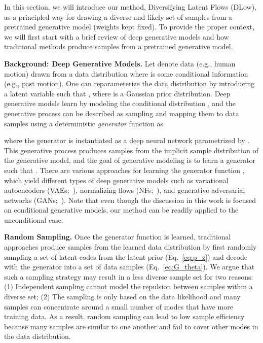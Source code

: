 \documentclass[runningheads]{llncs}
\begin{document}
	In this section, we will introduce our method, Diversifying Latent Flows (DLow), as a principled way for drawing a diverse and likely set of samples from a pretrained generative model (weights kept fixed). To provide the proper context, we will first start with a brief review of deep generative models and how traditional methods produce samples from a pretrained generative model.
	
	\vspace{2mm}
	\noindent\textbf{Background: Deep Generative Models.} 
	Let  denote data (e.g., human motion) drawn from a data distribution  where  is some conditional information (e.g., past motion). One can reparameterize the data distribution by introducing a latent variable  such that , where  is a Gaussian prior distribution. Deep generative models learn  by modeling the conditional distribution , and the generative process can be described as sampling  and mapping them to data samples  using a deterministic \emph{generator} function  as
	
	where the generator  is instantiated as a deep neural network parametrized by . This generative process produces samples from the implicit sample distribution  of the generative model, and the goal of generative modeling is to learn a generator  such that . There are various approaches for learning the generator function , which yield different types of deep generative models such as variational autoencoders (VAEs;~\cite{kingma2013auto}), normalizing flows (NFs;~\cite{rezende2015variational}), and generative adversarial networks (GANs;~\cite{goodfellow2014generative}). Note that even though the discussion in this work is focused on conditional generative models, our method can be readily applied to the unconditional case.
	
	\vspace{2mm}
	\noindent\textbf{Random Sampling.} 
	Once the generator function  is learned, traditional approaches produce samples from the learned data distribution  by first randomly sampling a set of latent codes  from the latent prior  (Eq.~\eqref{eq:p_z}) and decode  with the generator  into a set of data samples  (Eq.~\eqref{eq:G_theta}). We argue that such a sampling strategy may result in a less diverse sample set for two reasons: (1) Independent sampling cannot model the repulsion between samples within a diverse set; (2) The sampling is only based on the data likelihood and many samples can concentrate around a small number of modes that have more training data. As a result, random sampling can lead to low sample efficiency because many samples are similar to one another and fail to cover other modes in the data distribution.
	
\end{document}
